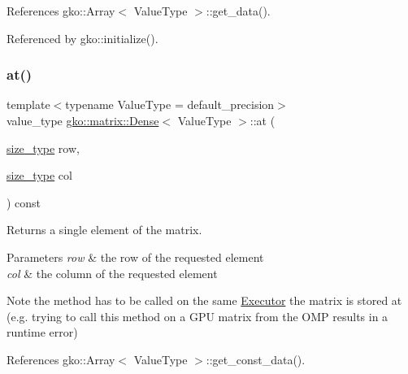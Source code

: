 References gko\+::\+Array$<$ Value\+Type $>$\+::get\+\_\+data().



Referenced by gko\+::initialize().

\mbox{\label{classgko_1_1matrix_1_1Dense_ae0b30c42359a03805dee41a5cbf87b26}} 
\subsubsection{\texorpdfstring{at()}{at()}\hspace{0.1cm}{\footnotesize\ttfamily [2/4]}}
{\footnotesize\ttfamily template$<$typename Value\+Type = default\+\_\+precision$>$ \\
value\+\_\+type \hyperlink{classgko_1_1matrix_1_1Dense}{gko\+::matrix\+::\+Dense}$<$ Value\+Type $>$\+::at (\begin{DoxyParamCaption}\item[{\hyperlink{namespacegko_a6e5c95df0ae4e47aab2f604a22d98ee7}{size\+\_\+type}}]{row,  }\item[{\hyperlink{namespacegko_a6e5c95df0ae4e47aab2f604a22d98ee7}{size\+\_\+type}}]{col }\end{DoxyParamCaption}) const\hspace{0.3cm}{\ttfamily [noexcept]}}



Returns a single element of the matrix. 


\begin{DoxyParams}{Parameters}
{\em row} & the row of the requested element \\
\hline
{\em col} & the column of the requested element\\
\hline
\end{DoxyParams}
\begin{DoxyNote}{Note}
the method has to be called on the same \hyperlink{classgko_1_1Executor}{Executor} the matrix is stored at (e.\+g. trying to call this method on a G\+PU matrix from the O\+MP results in a runtime error) 
\end{DoxyNote}


References gko\+::\+Array$<$ Value\+Type $>$\+::get\+\_\+const\+\_\+data().

\mbox{\label{classgko_1_1matrix_1_1Dense_ae6ce7585b533123b5572ddf502c9970f}} 
